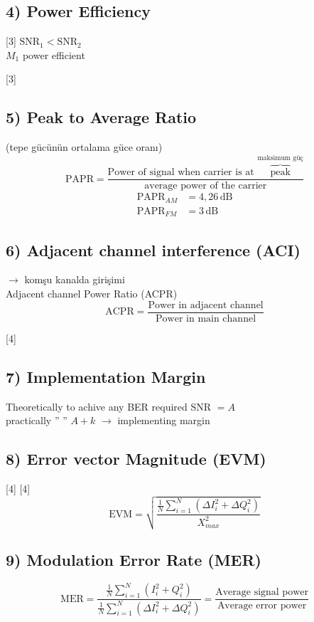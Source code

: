 \documentclass[11pt,a4paper]{article}
\begin{document}
\subsection{4) Power Efficiency}
[3]
$\mathrm{SNR}_1 < \mathrm{SNR}_2$\\
$M_1$ power efficient

[3]

\subsection{5) Peak to Average Ratio}
(tepe gücünün ortalama güce oranı)
\[ \mathrm{PAPR} = \frac{\text{Power of signal when carrier is at }\overbrace{\text{peak}}^{\text{maksimum güç}}}{\text{average power of the carrier}} \]
\begin{align*}
\mathrm{PAPR}_{AM} &= 4{,}26\,\mathrm{dB}\\
\mathrm{PAPR}_{FM} &= 3\,\mathrm{dB}
\end{align*}

\subsection{6) Adjacent channel interference (ACI)}
$\to$ komşu kanalda girişimi\\
Adjacent channel Power Ratio (ACPR)
\[ \mathrm{ACPR} = \frac{\text{Power in adjacent channel}}{\text{Power in main channel}} \]

[4]

\subsection{7) Implementation Margin}
Theoretically to achive any BER \quad required SNR $= A$\\
practically \quad '' \quad '' \quad $A + k$ $\to$ implementing margin

\subsection{8) Error vector Magnitude (EVM)}
[4]
[4]
\[ \mathrm{EVM} = \sqrt{\frac{\frac1N\sum_{i=1}^{N}\left(\Delta I_i^2+\Delta Q_i^2\right)}{X_{max}^2}} \]

\subsection{9) Modulation Error Rate (MER)}
\[ \mathrm{MER} = \frac{\frac1N\sum_{i=1}^{N}\left(I_i^2+Q_i^2\right)}{\frac1N\sum_{i=1}^{N}\left(\Delta I_i^2+\Delta Q_i^2\right)} = \frac{\text{Average signal power}}{\text{Average error power}} \]
\end{document}
